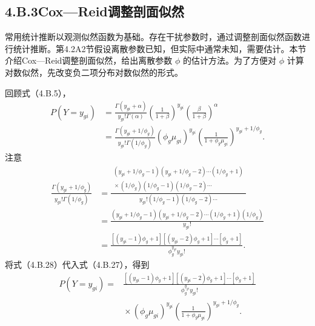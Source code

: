 \subsection*{4.B.3\quad Cox—Reid调整剖面似然}

常用统计推断以观测似然函数为基础。存在干扰参数时，通过调整剖面似然函数进行统计推断。第4.2A2节假设离散参数已知，但实际中通常未知，需要估计。本节介绍Cox—Reid调整剖面似然，给出离散参数 $\phi$ 的估计方法。为了方便对 $\phi$ 计算对数似然，先改变负二项分布对数似然的形式。

回顾式（4.B.5），
\begin{equation}
\begin{aligned}
P(Y=y_{gi})
&=\frac{\Gamma(y_{gi}+\alpha)}{y_{gi}!\Gamma(\alpha)}
 \left(\frac1{1+\beta}\right)^{y_{gi}}
 \left(\frac\beta{1+\beta}\right)^\alpha\\
&=\frac{\Gamma(y_{gi}+1/\phi_g)}{y_{gi}!\Gamma(1/\phi_g)}
 (\phi_g\mu_{gi})^{y_{gi}}
 \left(\frac1{1+\phi_g\mu_{gi}}\right)^{y_{gi}+1/\phi_g}.
\end{aligned}\tag{4.B.27}
\end{equation}
注意
\begin{equation}
\begin{aligned}
\frac{\Gamma(y_{gi}+1/\phi_g)}{y_{gi}!\Gamma(1/\phi_g)}
&=\frac{\begin{gathered}
 (y_{gi}+1/\phi_g-1)(y_{gi}+1/\phi_g-2)\cdots(1/\phi_g+1)\\
 {}\times(1/\phi_g)(1/\phi_g-1)(1/\phi_g-2)\cdots
 \end{gathered}}{
 y_{gi}!(1/\phi_g-1)(1/\phi_g-2)\cdots}\\
&=\frac{(y_{gi}+1/\phi_g-1)(y_{gi}+1/\phi_g-2)\cdots(1/\phi_g+1)(1/\phi_g)}{y_{gi}!}\\
&=\frac{[(y_{gi}-1)\phi_g+1][(y_{gi}-2)\phi_g+1]\cdots[\phi_g+1]}{
 \phi_g^{y_{gi}}y_{gi}!}.
\end{aligned}\tag{4.B.28}
\end{equation}
将式（4.B.28）代入式（4.B.27），得到
\begin{equation}
\begin{aligned}
P(Y=y_{gi})={}&
\frac{[(y_{gi}-1)\phi_g+1][(y_{gi}-2)\phi_g+1]\cdots[\phi_g+1]}{
 \phi_g^{y_{gi}}y_{gi}!}\\
&{}\times(\phi_g\mu_{gi})^{y_{gi}}
 \left(\frac1{1+\phi_g\mu_{gi}}\right)^{y_{gi}+1/\phi_g}.
\end{aligned}\tag{4.B.29}
\end{equation}
